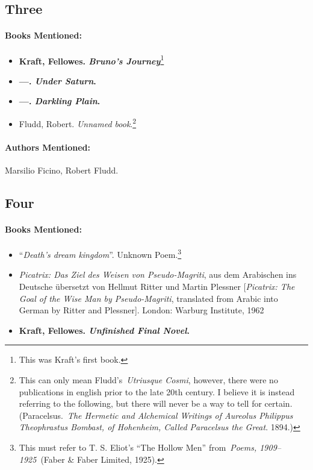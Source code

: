 \documentclass[12pt]{article}
\providecommand{\tightlist}{%
  \setlength{\itemsep}{0pt}\setlength{\parskip}{0pt}}
\begin{document}
\subsection{Three}\label{three-2}

\paragraph{Books Mentioned:}\label{books-mentioned-17}

\begin{itemize}
\tightlist
\item
  \textbf{Kraft, Fellowes. \emph{Bruno's Journey}}\footnote{This was Kraft's first book.}
\item
  \textbf{---. \emph{Under Saturn}.}
\item
  \textbf{---. \emph{Darkling Plain}.}
\item
  Fludd, Robert. \emph{Unnamed book}.\footnote{This can only mean Fludd's~\emph{Utriusque Cosmi}, however, there were no publications in english prior to the late 20th century. I believe it is instead referring to the following, but there will never be a way to tell for certain. (Paracelsus.~\emph{The Hermetic and Alchemical Writings of Aureolus Philippus Theophrastus Bombast, of Hohenheim, Called Paracelsus the Great}. 1894.)}
\end{itemize}

\paragraph{Authors Mentioned:}\label{authors-mentioned-13}

Marsilio Ficino, Robert Fludd.

\subsection{Four}\label{four-2}

\paragraph{Books Mentioned:}\label{books-mentioned-18}

\begin{itemize}
\tightlist
\item
  ``\emph{Death's dream kingdom}''. Unknown Poem.\footnote{This must refer to T. S. Eliot's ``The Hollow Men'' from~\emph{Poems, 1909--1925}~(Faber \& Faber Limited, 1925).}
\item
  \emph{Picatrix: Das Ziel des Weisen von Pseudo-Magriti}, aus dem Arabischen ins Deutsche übersetzt von Hellmut Ritter und Martin Plessner {[}\emph{Picatrix: The Goal of the Wise Man by Pseudo-Magriti}, translated from Arabic into German by Ritter and Plessner{]}. London: Warburg Institute, 1962
\item
  \textbf{Kraft, Fellowes. \emph{Unfinished Final Novel}.}
\end{itemize}
\end{document}
